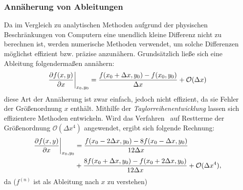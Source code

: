 \subsubsection{Annäherung von Ableitungen}

Da im Vergleich zu analytischen Methoden aufgrund der physischen Beschränkungen von Computern eine unendlich kleine Differenz nicht zu berechnen ist, werden numerische Methoden verwendet, um solche Differenzen möglichst effizient bzw. präzise anzunähern.
Grundsätzlich ließe sich eine Ableitung folgendermaßen annähern:
\begin{align*}
    \left.\frac{\partial f(x,y)}{\partial x}\right\vert_{x_0 , y_0} = \frac{f(x_0 +\Delta x,y_0)-f(x_0,y_0)}{\Delta x} + \mathcal{O}(\Delta x)
\end{align*}
diese Art der Annäherung ist zwar einfach, jedoch nicht effizient, da sie Fehler der Größenordnung $x$ enthält. Mithilfe der \emph{Taylorreihenentwicklung} lassen sich effizientere Methoden entwickeln. Wird das Verfahren~\cite[nach][S. ~51f.]{lecheler_computational_2022} auf Restterme der Größenordnung $\mathcal{O}(\Delta x^4)$ angewendet, ergibt sich folgende Rechnung:
\begin{equation}
\begin{align*}
\label{naeherung4}
    \left. \frac{\partial f(x,y)}{\partial x} \right\vert_{x_0,y_0} &= \frac{f(x_0-2\Delta x,y_0) - 8 f(x_0 -\Delta x,y_0)}{12\Delta x} \\
    &+ \frac{8f(x_0+\Delta x, y_0) - f(x_0 + 2\Delta x, y_0)}{12\Delta x} + \mathcal{O}(\Delta x^4),
\end{align*}
\end{equation}
da ($f^{(n)}$ ist als Ableitung nach $x$ zu verstehen)
